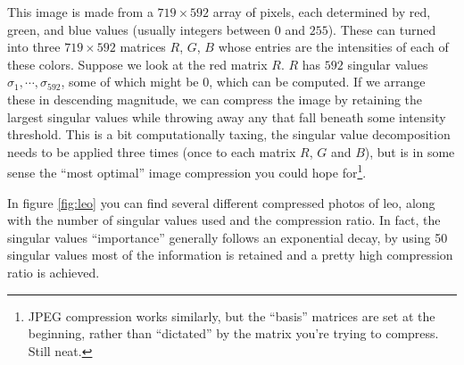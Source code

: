\documentclass[12pt]{article}
\numberwithin{equation}{subsection}
\numberwithin{figure}{subsection}
\theoremstyle{note}
\begin{document}
	This image is made from a $719\times 592$ array of pixels, each determined by red, green, and blue values (usually integers between $0$ and $255$). These can turned into three $719\times 592$ matrices $R$, $G$, $B$ whose entries are the intensities of each of these colors. Suppose we look at the red matrix $R$. $R$ has $592$ singular values $\sigma_1,\cdots, \sigma_{592}$, some of which might be 0, which can be computed. If we arrange these in descending magnitude, we can compress the image by retaining the largest singular values while throwing away any that fall beneath some intensity threshold. This is a bit computationally taxing, the singular value decomposition needs to be applied three times (once to each matrix $R$, $G$ and $B$), but is in some sense the ``most optimal'' image compression you could hope for\footnote{JPEG compression works similarly, but the ``basis'' matrices are set at the beginning, rather than ``dictated'' by the matrix you're trying to compress. Still neat.}.
	
	In figure \ref{fig:leo} you can find several different compressed photos of leo, along with the number of singular values used and the compression ratio. In fact, the singular values ``importance'' generally follows an exponential decay, by using 50 singular values most of the information is retained and a pretty high compression ratio is achieved. 
	
\end{document}
